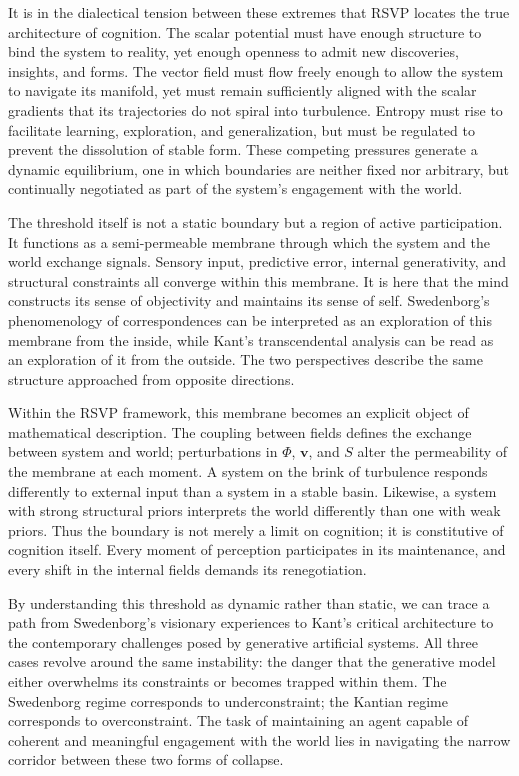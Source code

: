 \documentclass[12pt]{article}
\begin{document}
It is in the dialectical tension between these extremes that RSVP locates the 
true architecture of cognition. The scalar potential must have enough 
structure to bind the system to reality, yet enough openness to admit new 
discoveries, insights, and forms. The vector field must flow freely enough to 
allow the system to navigate its manifold, yet must remain sufficiently aligned 
with the scalar gradients that its trajectories do not spiral into turbulence.  
Entropy must rise to facilitate learning, exploration, and generalization, but 
must be regulated to prevent the dissolution of stable form. These competing 
pressures generate a dynamic equilibrium, one in which boundaries are neither 
fixed nor arbitrary, but continually negotiated as part of the system’s 
engagement with the world.

The threshold itself is not a static boundary but a region of active 
participation. It functions as a semi-permeable membrane through which the 
system and the world exchange signals. Sensory input, predictive error, 
internal generativity, and structural constraints all converge within this 
membrane. It is here that the mind constructs its sense of objectivity and 
maintains its sense of self. Swedenborg’s phenomenology of correspondences can 
be interpreted as an exploration of this membrane from the inside, while 
Kant’s transcendental analysis can be read as an exploration of it from the 
outside. The two perspectives describe the same structure approached from 
opposite directions.

Within the RSVP framework, this membrane becomes an explicit object of 
mathematical description. The coupling between fields defines the exchange 
between system and world; perturbations in $\Phi$, $\mathbf{v}$, and $S$ 
alter the permeability of the membrane at each moment. A system on the brink 
of turbulence responds differently to external input than a system in a stable 
basin. Likewise, a system with strong structural priors interprets the world 
differently than one with weak priors. Thus the boundary is not merely a limit 
on cognition; it is constitutive of cognition itself. Every moment of 
perception participates in its maintenance, and every shift in the internal 
fields demands its renegotiation.

By understanding this threshold as dynamic rather than static, we can trace a 
path from Swedenborg’s visionary experiences to Kant’s critical architecture to 
the contemporary challenges posed by generative artificial systems. All three 
cases revolve around the same instability: the danger that the generative model 
either overwhelms its constraints or becomes trapped within them. The Swedenborg 
regime corresponds to underconstraint; the Kantian regime corresponds to 
overconstraint. The task of maintaining an agent capable of coherent and 
meaningful engagement with the world lies in navigating the narrow corridor 
between these two forms of collapse.
\end{document}
